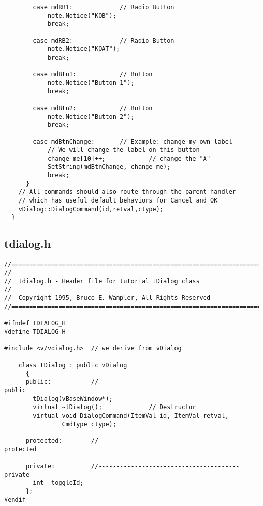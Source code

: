 \begin{verbatim}
        case mdRB1:             // Radio Button
            note.Notice("KOB");
            break;

        case mdRB2:             // Radio Button
            note.Notice("KOAT");
            break;

        case mdBtn1:            // Button
            note.Notice("Button 1");
            break;

        case mdBtn2:            // Button
            note.Notice("Button 2");
            break;

        case mdBtnChange:       // Example: change my own label
            // We will change the label on this button
            change_me[10]++;            // change the "A"
            SetString(mdBtnChange, change_me);
            break;
      }
    // All commands should also route through the parent handler
    // which has useful default behaviors for Cancel and OK
    vDialog::DialogCommand(id,retval,ctype);
  }
\end{verbatim}
\normalfont\normalsize

\subsection*{tdialog.h}
%
\footnotesize
\begin{verbatim}
//========================================================================
//
//  tdialog.h - Header file for tutorial tDialog class
//
//  Copyright 1995, Bruce E. Wampler, All Rights Reserved
//========================================================================

#ifndef TDIALOG_H
#define TDIALOG_H

#include <v/vdialog.h>  // we derive from vDialog

    class tDialog : public vDialog
      {
      public:           //---------------------------------------- public
        tDialog(vBaseWindow*);
        virtual ~tDialog();             // Destructor
        virtual void DialogCommand(ItemVal id, ItemVal retval,
                CmdType ctype);

      protected:        //------------------------------------- protected

      private:          //--------------------------------------- private
        int _toggleId;
      };
#endif
\end{verbatim}
\normalfont\normalsize

